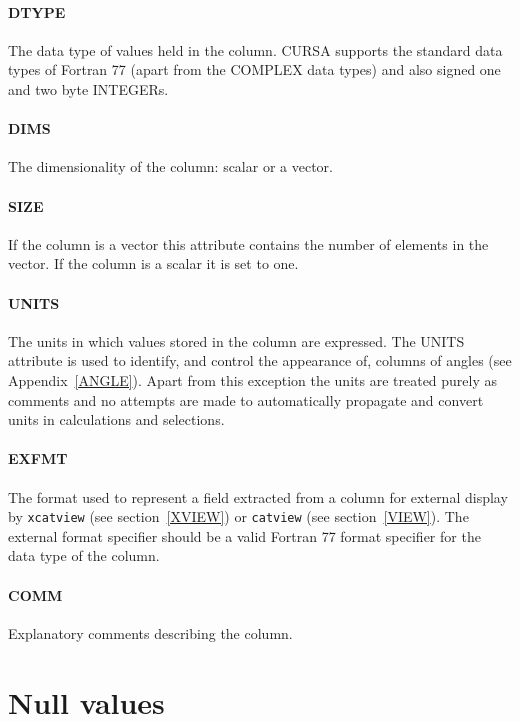 \documentclass[twoside,11pt]{starlink}
\begin{document}
\paragraph{DTYPE}
The data type of values held in the column. CURSA supports the
standard data types of Fortran 77 (apart from the COMPLEX data types)
and also signed one and two byte INTEGERs.

\paragraph{DIMS}
The dimensionality of the column: scalar or a vector.

\paragraph{SIZE}
If the column is a vector this attribute contains the number of
elements in the vector. If the column is a scalar it is set to one.

\paragraph{UNITS}
The units in which values stored in the column are expressed. The UNITS
attribute is used to identify, and control the appearance of, columns
of angles (see Appendix~\ref{ANGLE}). Apart from this exception the units
are treated purely as comments and no attempts are made to automatically
propagate and convert units in calculations and selections.

\paragraph{EXFMT}
The format used to represent a field extracted from a column for
external display by \texttt{xcatview} (see section~\ref{XVIEW}) or \texttt{catview} (see section~\ref{VIEW}). The external format specifier should be
a valid Fortran 77 format specifier for the data type of the column.

\paragraph{COMM}
Explanatory comments describing the column.


\section{\label{NULLS}Null values}
\end{document}
